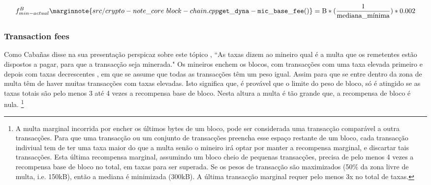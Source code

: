 \[f^{B}_{min-actual}\marginnote{src/crypto- note\_core\ block- chain.cpp {\tt get\_dyna- mic\_base\_ fee()}} = \textrm{B}*(\frac{1}{\textrm{mediana\_mínima}}) * 0.002\]

\subsubsection*{Transaction fees}

Como Cabañas disse na sua presentação perspicaz sobre este tópico \cite{articmine-36c3-dynamics}, ``As taxas dizem ao mineiro qual é a multa que os remetentes estão dispostos a pagar, para que a transacção seja minerada."
Os mineiros enchem os blocos, com transacções com uma taxa elevada primeiro e depois com taxas decrescentes \cite{articmine-36c3-dynamics}, em que se assume que todas as transacções têm um peso igual. Assim para que se entre dentro da zona de multa têm de haver muitas transacções com taxas elevadas. Isto significa que, é provável que o limite do peso de bloco, só é atingido se as taxas totais são pelo menos 3 até 4 vezes a recompensa base de bloco. Nesta altura a multa é tão grande que, a recompensa de bloco é nula.     
\footnote{\label{penaltyzonecost_footnote}
A multa marginal incorrida por encher os últimos bytes de um bloco, pode ser considerada uma transacção comparável a outra transacções. Para que uma transacção ou um conjunto de transacções preencha esse espaço restante de um bloco, cada transacção indiviual tem de ter uma taxa maior do que a multa senão o mineiro irá optar por manter a recompensa marginal, e discartar tais transacções. Esta última recompensa marginal, assumindo um bloco cheio de pequenas transacções, precisa de pelo menos 4 vezes a recompensa base de bloco no total, em taxas para ser superada. Se os pesos de transacção são maximizados (50\% da zona livre de multa, i.e. 150kB), então a mediana é minimizada (300kB). A última transacção marginal requer pelo menos 3x no total de taxas.}    
